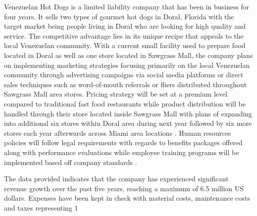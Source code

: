 

Venezuelan Hot Dogs is a limited liability company that has been in business for four years. It sells two types of gourmet hot dogs in Doral, Florida with the target market being people living in Doral who are looking for high quality and service. The competitive advantage lies in its unique recipe that appeals to the local Venezuelan community. With a current small facility used to prepare food located in Doral as well as one store located in Sawgrass Mall, the company plans on implementing marketing strategies focusing primarily on the local Venezuelan community through advertising campaigns via social media platforms or direct sales techniques such as word-of-mouth referrals or fliers distributed throughout Sawgrass Mall area stores. Pricing strategy will be set at a premium level compared to traditional fast food restaurants while product distribution will be handled through their store located inside Sawgrass Mall with plans of expanding into additional six stores within Doral area during next year followed by six more stores each year afterwards across Miami area locations . Human resources policies will follow legal requirements with regards to benefits packages offered along with performance evaluations while employee training programs will be implemented based off company standards . 

The data provided indicates that the company has experienced significant revenue growth over the past five years, reaching a maximum of 6.5 million US dollars. Expenses have been kept in check with material costs, maintenance costs and taxes representing 1%